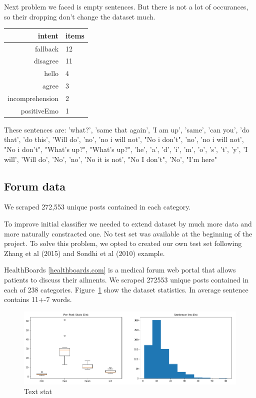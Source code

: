 \documentclass[11pt]{article}
\begin{document}
Next problem we faced is empty sentences. But there is not a lot of occurances, so their dropping don't change the dataset much.

\begin{tabular}{ |r|l| }
\hline
intent & items \\ \hline
fallback          & 12 \\ \hline
disagree          & 11 \\ \hline
hello             &  4 \\ \hline
agree             &  3 \\ \hline
incomprehension   &  2 \\ \hline
positiveEmo       &  1 \\ \hline
\end{tabular}

These sentences are: 'what?', 'same that again', 'I am up', 'same', 'can you',
       'do that', 'do this', 'Will do', 'no', 'no i will not',
       "No i don't", 'no', 'no i will not', "No i don't", "What's up?",
       "What's up?", 'he', 'a', 'd', 'i', 'm', 'o', 's', 't', 'y',
       'I will', 'Will do', 'No', 'no', 'No it is not', "No I don't",
       'No', "I'm here"


\subsection{Forum data}

We scraped 272,553 unique posts contained in each category. 

To improve initial classifier we needed to extend dataset by much more data and more naturally constracted one. No  test  set was available at the beginning of the project. To solve this  problem,  we  opted  to  created  our  own  test set following Zhang et al (2015) and Sondhi et al (2010) example.  

HealthBoards \ref{healthboards.com} is a medical forum web portal that allows patients to discuss their ailments. We scraped 272553 unique posts contained in each of 238 categories. Figure~\ref{forum_data_stat} show the dataset statistics. In average sentence contains 11+-7 words.


 \begin{figure}[h]
 	\centering
 	\includegraphics[scale=0.5]{report3.png}
	\caption{Text stat}\label{forum_data_stat}
 \end{figure}
\FloatBarrier
\end{document}
